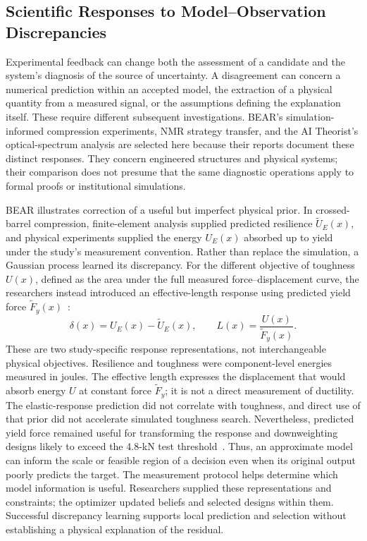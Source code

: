 \subsection{Scientific Responses to Model--Observation Discrepancies}
\label{sec:model-observation}

Experimental feedback can change both the assessment of a candidate and the system's diagnosis of the source of uncertainty. A disagreement can concern a numerical prediction within an accepted model, the extraction of a physical quantity from a measured signal, or the assumptions defining the explanation itself. These require different subsequent investigations. BEAR's simulation-informed compression experiments, NMR strategy transfer, and the AI Theorist's optical-spectrum analysis are selected here because their reports document these distinct responses. They concern engineered structures and physical systems; their comparison does not presume that the same diagnostic operations apply to formal proofs or institutional simulations.

BEAR illustrates correction of a useful but imperfect physical prior. In crossed-barrel compression, finite-element analysis supplied predicted resilience $\widetilde U_E(x)$, and physical experiments supplied the energy $U_E(x)$ absorbed up to yield under the study's measurement convention. Rather than replace the simulation, a Gaussian process learned its discrepancy. For the different objective of toughness $U(x)$, defined as the area under the full measured force--displacement curve, the researchers instead introduced an effective-length response using predicted yield force $\widetilde F_y(x)$~\cite{asd0615}:
\begin{equation}
\delta(x)=U_E(x)-\widetilde U_E(x),\qquad
L(x)=\frac{U(x)}{\widetilde F_y(x)}.
\label{eq:bear-response}
\end{equation}
These are two study-specific response representations, not interchangeable physical objectives. Resilience and toughness were component-level energies measured in joules. The effective length expresses the displacement that would absorb energy $U$ at constant force $\widetilde F_y$; it is not a direct measurement of ductility. The elastic-response prediction did not correlate with toughness, and direct use of that prior did not accelerate simulated toughness search. Nevertheless, predicted yield force remained useful for transforming the response and downweighting designs likely to exceed the 4.8-kN test threshold~\cite{asd0615}. Thus, an approximate model can inform the scale or feasible region of a decision even when its original output poorly predicts the target. The measurement protocol helps determine which model information is useful. Researchers supplied these representations and constraints; the optimizer updated beliefs and selected designs within them. Successful discrepancy learning supports local prediction and selection without establishing a physical explanation of the residual.


